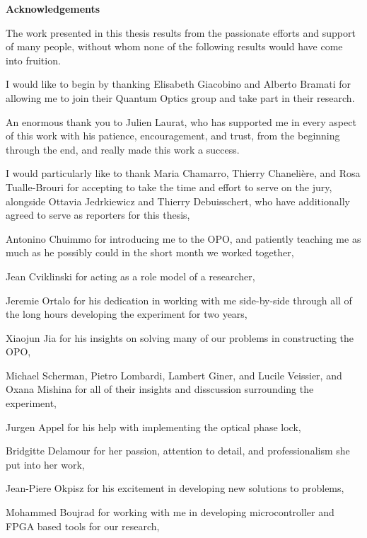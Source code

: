 \null
\addtolength{\textheight}{20mm}
\cleardoublepage
\pagestyle{empty} 
\addtolength{\parskip}{5 pt}

\begin{center}
\textbf{\large Acknowledgements}
\end{center}

\noindent
The work presented in this thesis results from the passionate efforts and support of many people, without whom none of the following results would have come into fruition.

\noindent
I would like to begin by thanking Elisabeth Giacobino and Alberto Bramati for allowing me to join their Quantum Optics group and take part in their research.  

\noindent
An enormous thank you to Julien Laurat, who has supported me in every aspect of this work with his patience, encouragement, and trust, from the beginning through the end, and really made this work a success.

\noindent
I would particularly like to thank Maria Chamarro, Thierry Chaneli\`ere, and Rosa Tualle-Brouri for accepting to take the time and effort to serve on the jury, alongside Ottavia Jedrkiewicz and Thierry Debuisschert, who have additionally agreed to serve as reporters for this thesis,

\noindent
Antonino Chuimmo for introducing me to the OPO, and patiently teaching me as much as he possibly could in the short month we worked together,  

\noindent
Jean Cviklinski for acting as a role model of a researcher,  

\noindent
Jeremie Ortalo for his dedication in working with me side-by-side through all of the long hours developing the experiment for two years,

\noindent
Xiaojun Jia for his insights on solving many of our problems in constructing the OPO,

\noindent
Michael Scherman, Pietro Lombardi, Lambert Giner, and Lucile Veissier, and Oxana Mishina for all of their insights and disscussion surrounding the experiment,

\noindent
Jurgen Appel for his help with implementing the optical phase lock,

\noindent
Bridgitte Delamour for her passion, attention to detail, and professionalism she put into her work,

\noindent
Jean-Piere Okpisz for his excitement in developing new solutions to problems,

\noindent
Mohammed Boujrad for working with me in developing microcontroller and FPGA based tools for our research,


